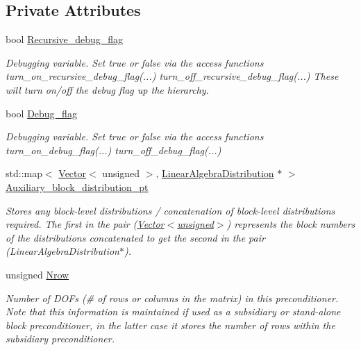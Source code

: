 \subsection*{Private Attributes}
\begin{DoxyCompactItemize}
\item 
bool \hyperlink{classoomph_1_1BlockPreconditioner_ae6ce543de76eedb34a2562eecceb222b}{Recursive\+\_\+debug\+\_\+flag}
\begin{DoxyCompactList}\small\item\em Debugging variable. Set true or false via the access functions turn\+\_\+on\+\_\+recursive\+\_\+debug\+\_\+flag(...) turn\+\_\+off\+\_\+recursive\+\_\+debug\+\_\+flag(...) These will turn on/off the debug flag up the hierarchy. \end{DoxyCompactList}\item 
bool \hyperlink{classoomph_1_1BlockPreconditioner_ab4647ea06ca7cf44c8de695ba35f3e97}{Debug\+\_\+flag}
\begin{DoxyCompactList}\small\item\em Debugging variable. Set true or false via the access functions turn\+\_\+on\+\_\+debug\+\_\+flag(...) turn\+\_\+off\+\_\+debug\+\_\+flag(...) \end{DoxyCompactList}\item 
std\+::map$<$ \hyperlink{classoomph_1_1Vector}{Vector}$<$ unsigned $>$, \hyperlink{classoomph_1_1LinearAlgebraDistribution}{Linear\+Algebra\+Distribution} $\ast$ $>$ \hyperlink{classoomph_1_1BlockPreconditioner_a555ed672f4bcc8fcf72806154fd3ce0b}{Auxiliary\+\_\+block\+\_\+distribution\+\_\+pt}
\begin{DoxyCompactList}\small\item\em Stores any block-\/level distributions / concatenation of block-\/level distributions required. The first in the pair (\hyperlink{classoomph_1_1Vector}{Vector$<$unsigned$>$}) represents the block numbers of the distributions concatenated to get the second in the pair (Linear\+Algebra\+Distribution$\ast$). \end{DoxyCompactList}\item 
unsigned \hyperlink{classoomph_1_1BlockPreconditioner_a4aa232afd2a76adac97fb7d484a18c5e}{Nrow}
\begin{DoxyCompactList}\small\item\em Number of D\+O\+Fs (\# of rows or columns in the matrix) in this preconditioner. Note that this information is maintained if used as a subsidiary or stand-\/alone block preconditioner, in the latter case it stores the number of rows within the subsidiary preconditioner. \end{DoxyCompactList}\item 

\end{DoxyCompactItemize}
